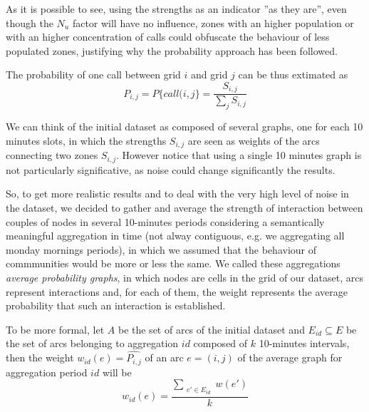 As it is possible to see, using the strengths as an indicator ''as they are'', even though the $N_{u}$ factor will have no influence, 
zones with an higher population or with an higher concentration of calls could obfuscate the behaviour of less populated zones, justifying 
why the probability approach has been followed.

The probability of one call between grid $i$ and grid $j$ can be thus extimated as
$$
P_{i,j} = P\{call(i,j\} = \frac{S_{i,j}}{\sum_{j}{}{S_{i,j}}}
$$

We can think of the initial dataset as composed of several graphs, one for each 10 minutes slots, in which the strengths $S_{i,j}$ are seen as weights of the arcs connecting two zones $S_{i,j}$. 
However notice that using a single 10 minutes graph is not particularly significative, as noise could change significantly the results.

So, to get more realistic results and to deal with the very high level of noise in the dataset,
we decided to gather and average the strength of interaction between couples of nodes in several 10-minutes periods
considering a semantically meaningful aggregation in time (not alway contiguous, e.g. we aggregating all monday
mornings periods), in which we assumed that the behaviour of commmunities would be more or less the same.
\label{AVGPG}
We called these aggregations \emph{average probability graphs}, in which nodes are cells in the grid of our dataset, arcs represent interactions and, for each of them, the weight represents the average probability that such an interaction is established.

To be more formal, let $A$ be the set of arcs of the initial dataset and $E_{id} \subseteq E$ be the set of arcs belonging to aggregation $id$ composed of $k$ 10-minutes intervals, then the weight $w_{id}(e)=\widehat{P_{i,j}}$ of an arc $e=(i,j)$ of the average graph for aggregation period $id$ will be 
$$
w_{id}(e) = \frac{\sum_{\substack{e' \in E_{id}}} w(e')}{k}
$$


